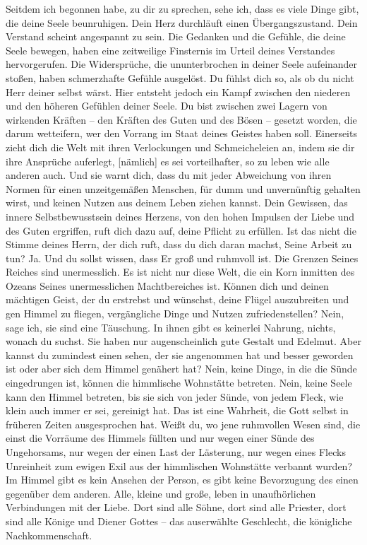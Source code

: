 Seitdem ich begonnen habe, zu dir zu sprechen, sehe ich, dass es viele Dinge gibt, die deine Seele beunruhigen. Dein Herz durchläuft einen Übergangszustand. Dein Verstand scheint angespannt zu sein. Die Gedanken und die Gefühle, die deine Seele bewegen, haben eine zeitweilige Finsternis im Urteil deines Verstandes hervorgerufen. Die Widersprüche, die ununterbrochen in deiner Seele aufeinander stoßen, haben schmerzhafte Gefühle ausgelöst. Du fühlst dich so, als ob du nicht Herr deiner selbst wärst. Hier entsteht jedoch ein Kampf zwischen den niederen und den höheren Gefühlen deiner Seele. Du bist zwischen zwei Lagern von wirkenden Kräften -- den Kräften des Guten und des Bösen -- gesetzt worden, die darum wetteifern, wer den Vorrang im Staat deines Geistes haben soll. Einerseits zieht dich die Welt mit ihren Verlockungen und Schmeicheleien an, indem sie dir ihre Ansprüche auferlegt, [nämlich] es sei vorteilhafter, so zu leben wie alle anderen auch. Und sie warnt dich, dass du mit jeder Abweichung von ihren Normen für einen unzeitgemäßen Menschen, für dumm und unvernünftig gehalten wirst, und keinen Nutzen aus deinem Leben ziehen kannst. Dein Gewissen, das innere Selbstbewusstsein deines Herzens, von den hohen Impulsen der Liebe und des Guten ergriffen, ruft dich dazu auf, deine Pflicht zu erfüllen. Ist das nicht die Stimme deines Herrn, der dich ruft, dass du dich daran machst, Seine Arbeit zu tun? Ja. Und du sollst wissen, dass Er groß und ruhmvoll ist. Die Grenzen Seines Reiches sind unermesslich. Es ist nicht nur diese Welt, die ein Korn inmitten des Ozeans Seines unermesslichen Machtbereiches ist. Können dich und deinen mächtigen Geist, der du erstrebst und wünschst, deine Flügel auszubreiten und gen Himmel zu fliegen, vergängliche Dinge und Nutzen zufriedenstellen? Nein, sage ich, sie sind eine Täuschung. In ihnen gibt es keinerlei Nahrung, nichts, wonach du suchst. Sie haben nur augenscheinlich gute Gestalt und Edelmut. Aber kannst du zumindest einen sehen, der sie angenommen hat und besser geworden ist oder aber sich dem Himmel genähert hat? Nein, keine Dinge, in die die Sünde eingedrungen ist, können die himmlische Wohnstätte betreten. Nein, keine Seele kann den Himmel betreten, bis sie sich von jeder Sünde, von jedem Fleck, wie klein auch immer er sei, gereinigt hat. Das ist eine Wahrheit, die Gott selbst in früheren Zeiten ausgesprochen hat. Weißt du, wo jene ruhmvollen Wesen sind, die einst die Vorräume des Himmels füllten und nur wegen einer Sünde des Ungehorsams, nur wegen der einen Last der Lästerung, nur wegen eines Flecks Unreinheit zum ewigen Exil aus der himmlischen Wohnstätte verbannt wurden? Im Himmel gibt es kein Ansehen der Person, es gibt keine Bevorzugung des einen gegenüber dem anderen. Alle, kleine und große, leben in unaufhörlichen Verbindungen mit der Liebe. Dort sind alle Söhne, dort sind alle Priester, dort sind alle Könige und Diener Gottes -- das auserwählte Geschlecht, die königliche Nachkommenschaft.

